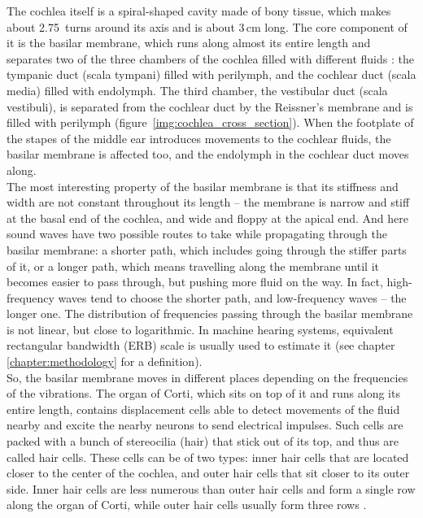 The cochlea itself is a spiral-shaped cavity made of bony tissue, which makes about 2.75~turns around its axis and is about 3\,cm long. The core component of it is the basilar membrane, which runs along almost its entire length and separates two of the three chambers of the cochlea filled with different fluids \cite{Schnupp2011}: the tympanic duct (scala tympani) filled with perilymph, and the cochlear duct (scala media) filled with endolymph. The third chamber, the vestibular duct (scala vestibuli), is separated from the cochlear duct by the Reissner’s membrane and is filled with peri\-lymph (figure~\ref{img:cochlea_cross_section}). When the footplate of the stapes of the middle ear introduces movements to the cochlear fluids, the basilar membrane is affected too, and the endolymph in the cochlear duct moves along.\\

The most interesting property of the basilar membrane is that its stiffness and width are not constant throughout its length – the membrane is narrow and stiff at the basal end of the cochlea, and wide and floppy at the apical end. And here sound waves have two possible routes to take while propagating through the basilar membrane: a shorter path, which includes going through the stiffer parts of it, or a longer path, which means travelling along the membrane until it becomes easier to pass through, but pushing more fluid on the way. In fact, high-frequency waves tend to choose the shorter path, and low-frequency waves – the longer one. The distribution of frequencies passing through the basilar membrane is not linear, but close to logarithmic. In machine hearing systems, equivalent rectangular bandwidth (ERB) scale is usually used to estimate it (see chapter \ref{chapter:methodology} for a definition).\\

So, the basilar membrane moves in different places depending on the frequencies of the vibrations. The organ of Corti, which sits on top of it and runs along its entire length, contains displacement cells able to detect movements of the fluid nearby and excite the nearby neurons to send electrical impulses. Such cells are packed with a bunch of stereocilia (hair) that stick out of its top, and thus are called hair cells. These cells can be of two types: inner hair cells that are located closer to the center of the cochlea, and outer hair cells that sit closer to its outer side. Inner hair cells are less numerous than outer hair cells and form a single row along the organ of Corti, while outer hair cells usually form three rows \cite{Schnupp2011}.\\

